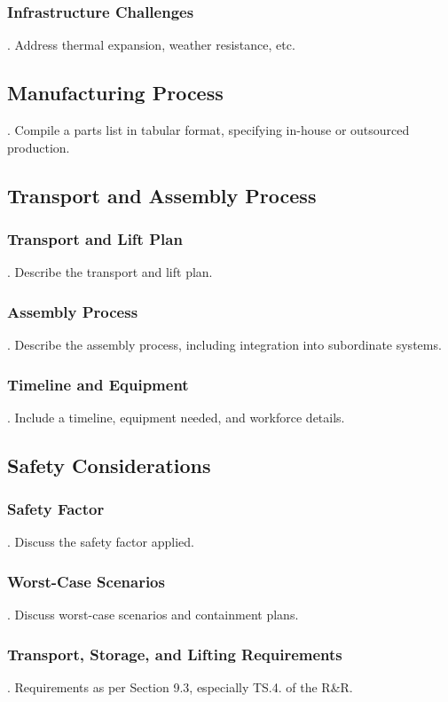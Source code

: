 \subsubsection{Infrastructure Challenges}
.  Address thermal expansion, weather resistance, etc.

\subsection{Manufacturing Process}
.  Compile a parts list in tabular format, specifying in-house or outsourced production.

\subsection{Transport and Assembly Process}
\subsubsection{Transport and Lift Plan}
.  Describe the transport and lift plan.
\subsubsection{Assembly Process}
.  Describe the assembly process, including integration into subordinate systems.
\subsubsection{Timeline and Equipment}
.  Include a timeline, equipment needed, and workforce details.

\subsection{Safety Considerations}
\subsubsection{Safety Factor}
.  Discuss the safety factor applied.
\subsubsection{Worst-Case Scenarios}
.  Discuss worst-case scenarios and containment plans.
\subsubsection{Transport, Storage, and Lifting Requirements}
.  Requirements as per Section 9.3, especially TS.4. of the R\&R.
